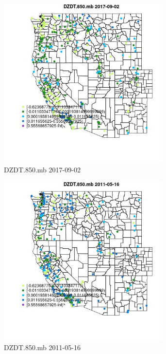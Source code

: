 \begin{figure} 
\centering  
\includegraphics[width=0.77\textwidth]{Code_Outputs/Report_ML_input_PM25_Step4_part_e_de_duplicated_aves_compiled_2019-05-21wNAs_MapObsDZDT850mb2017-09-02.jpg} 
\caption{\label{fig:Report_ML_input_PM25_Step4_part_e_de_duplicated_aves_compiled_2019-05-21wNAsMapObsDZDT850mb2017-09-02}DZDT.850.mb 2017-09-02} 
\end{figure} 
 

\begin{figure} 
\centering  
\includegraphics[width=0.77\textwidth]{Code_Outputs/Report_ML_input_PM25_Step4_part_e_de_duplicated_aves_compiled_2019-05-21wNAs_MapObsDZDT850mb2011-05-16.jpg} 
\caption{\label{fig:Report_ML_input_PM25_Step4_part_e_de_duplicated_aves_compiled_2019-05-21wNAsMapObsDZDT850mb2011-05-16}DZDT.850.mb 2011-05-16} 
\end{figure} 
 

